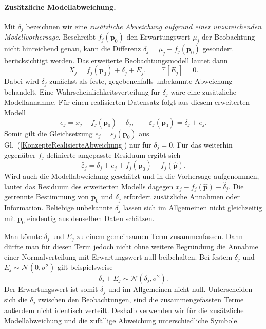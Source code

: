 \paragraph{Zusätzliche Modellabweichung.}
Mit $\delta_j$ bezeichnen wir eine \textsl{zusätzliche Abweichung aufgrund
einer unzureichenden Modellvorhersage}. Beschreibt
$f_j(\mathbf{p}_0)$ den Erwartungswert $\mu_j$ der Beobachtung nicht
hinreichend genau, kann die Differenz
$\delta_j=\mu_j-f_j(\mathbf{p}_0)$ gesondert berücksichtigt werden.
Das erweiterte Beobachtungsmodell lautet dann
\begin{equation}
X_j=f_j(\mathbf{p}_0)+\delta_j+E_j,
\qquad \mathbb{E}[E_j]=0.
\label{KonzepteZusaetzlicheModellabweichung}
\end{equation}
Dabei wird $\delta_j$ zunächst als feste, gegebenenfalls unbekannte
Abweichung behandelt. Eine Wahrscheinlichkeitsverteilung für $\delta_j$
wäre eine zusätzliche Modellannahme. Für einen realisierten Datensatz
folgt aus diesem erweiterten Modell
\begin{equation}
e_j=x_j-f_j(\mathbf{p}_0)-\delta_j,
\qquad
\varepsilon_j(\mathbf{p}_0)=\delta_j+e_j.
\label{KonzepteRealisierungMitModellabweichung}
\end{equation}
Somit gilt die Gleichsetzung
$e_j=\varepsilon_j(\mathbf{p}_0)$ aus
Gl.~(\ref{KonzepteRealisierteAbweichung}) nur für $\delta_j=0$.
Für das weiterhin gegenüber $f_j$ definierte angepasste Residuum ergibt sich
\begin{equation}
\widehat{\varepsilon}_j
=\delta_j+e_j+f_j(\mathbf{p}_0)-f_j(\widehat{\mathbf{p}}).
\label{KonzepteAngepasstesResiduumMitModellabweichung}
\end{equation}
Wird auch die Modellabweichung geschätzt und in die Vorhersage aufgenommen,
lautet das Residuum des erweiterten Modells dagegen
$x_j-f_j(\widehat{\mathbf{p}})-\widehat{\delta}_j$.
Die getrennte Bestimmung von $\mathbf{p}_0$ und $\delta_j$ erfordert
zusätzliche Annahmen oder Information. Beliebige unbekannte
$\delta_j$ lassen sich im Allgemeinen nicht gleichzeitig mit
$\mathbf{p}_0$ eindeutig aus denselben Daten schätzen.

Man könnte $\delta_j$ und $E_j$ zu einem gemeinsamen Term zusammenfassen.
Dann dürfte man für diesen Term jedoch nicht ohne weitere Begründung
die Annahme einer Normalverteilung mit Erwartungswert null beibehalten.
Bei festem $\delta_j$ und $E_j\sim\mathcal{N}(0,\sigma^2)$ gilt beispielsweise
\begin{equation}
\delta_j+E_j\sim\mathcal{N}(\delta_j,\sigma^2).
\end{equation}
Der Erwartungswert ist somit $\delta_j$ und im Allgemeinen nicht null.
Unterscheiden sich die $\delta_j$ zwischen den Beobachtungen, sind die
zusammengefassten Terme außerdem nicht identisch verteilt.
Deshalb verwenden wir für die zusätzliche Modellabweichung und die
zufällige Abweichung unterschiedliche Symbole.

